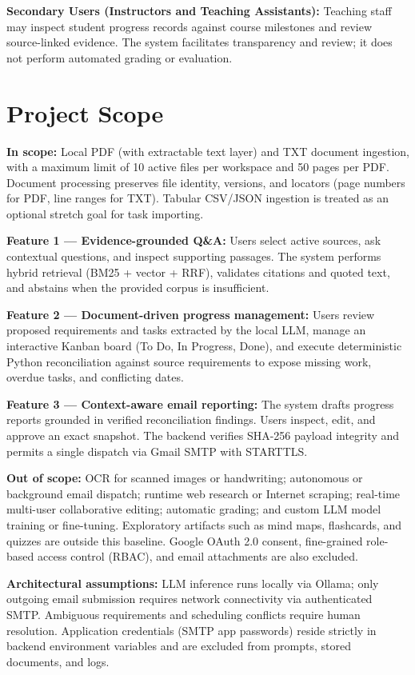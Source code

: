 \textbf{Secondary Users (Instructors and Teaching Assistants):} Teaching staff may inspect student progress records against course milestones and review source-linked evidence. The system facilitates transparency and review; it does not perform automated grading or evaluation.

\section{Project Scope}

\textbf{In scope:} Local PDF (with extractable text layer) and TXT document ingestion, with a maximum limit of 10 active files per workspace and 50 pages per PDF. Document processing preserves file identity, versions, and locators (page numbers for PDF, line ranges for TXT). Tabular CSV/JSON ingestion is treated as an optional stretch goal for task importing.

\textbf{Feature 1 — Evidence-grounded Q\&A:} Users select active sources, ask contextual questions, and inspect supporting passages. The system performs hybrid retrieval (BM25 + vector + RRF), validates citations and quoted text, and abstains when the provided corpus is insufficient.

\textbf{Feature 2 — Document-driven progress management:} Users review proposed requirements and tasks extracted by the local LLM, manage an interactive Kanban board (To Do, In Progress, Done), and execute deterministic Python reconciliation against source requirements to expose missing work, overdue tasks, and conflicting dates.

\textbf{Feature 3 — Context-aware email reporting:} The system drafts progress reports grounded in verified reconciliation findings. Users inspect, edit, and approve an exact snapshot. The backend verifies SHA-256 payload integrity and permits a single dispatch via Gmail SMTP with STARTTLS.

\textbf{Out of scope:} OCR for scanned images or handwriting; autonomous or background email dispatch; runtime web research or Internet scraping; real-time multi-user collaborative editing; automatic grading; and custom LLM model training or fine-tuning. Exploratory artifacts such as mind maps, flashcards, and quizzes are outside this baseline. Google OAuth 2.0 consent, fine-grained role-based access control (RBAC), and email attachments are also excluded.

\textbf{Architectural assumptions:} LLM inference runs locally via Ollama; only outgoing email submission requires network connectivity via authenticated SMTP. Ambiguous requirements and scheduling conflicts require human resolution. Application credentials (SMTP app passwords) reside strictly in backend environment variables and are excluded from prompts, stored documents, and logs.

